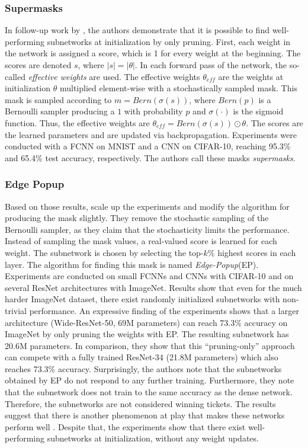 \subsubsection{Supermasks}
In follow-up work by \textcite{DBLP:conf/nips/ZhouLLY19}, the authors demonstrate that it is possible to find well-performing subnetworks at initialization by only pruning.
First, each weight in the network is assigned a score, which is 1 for every weight at the beginning. 
The scores are denoted $s$, where $|s| = |\theta|$.
In each forward pass of the network, the so-called \textit{effective weights} are used.
The effective weights $\theta_{eff}$ are the weights at initialization $\theta$ multiplied element-wise with a stochastically sampled mask.
This mask is sampled according to $m = \textit{Bern}(\sigma(s))$, where $\textit{Bern}(p)$ is a Bernoulli sampler producing a $1$ with probability $p$ and $\sigma(\cdot)$ is the sigmoid function. 
Thus, the effective weights are $\theta_{eff} = \textit{Bern}(\sigma(s)) \odot \theta$.
The scores are the learned parameters and are updated via backpropagation.
Experiments were conducted with a FCNN on MNIST and a CNN on CIFAR-10, reaching 95.3\% and 65.4\% test accuracy, respectively.
The authors call these masks \textit{supermasks}.

\subsubsection{Edge Popup}
Based on those results, \textcite{DBLP:conf/cvpr/RamanujanWKFR20} scale up the experiments and modify the algorithm for producing the mask slightly.
They remove the stochastic sampling of the Bernoulli sampler, as they claim that the stochasticity limits the performance. 
Instead of sampling the mask values, a real-valued score is learned for each weight. 
The subnetwork is chosen by selecting the top-$k$\% highest scores in each layer.
The algorithm for finding this mask is named \textit{Edge-Popup}(EP).
Experiments are conducted on small FCNNs and CNNs with CIFAR-10 and on several ResNet architectures with ImageNet.
Results show that even for the much harder ImageNet dataset, there exist randomly initialized subnetworks with non-trivial performance. 
An expressive finding of the experiments shows that a larger architecture (Wide-ResNet-50, 69M parameters) can reach 73.3\% accuracy on ImageNet by only pruning the weights with EP.
The resulting subnetwork has 20.6M parameters. In comparison, they show that this “pruning-only” approach can compete with a fully trained ResNet-34 (21.8M parameters) which also reaches 73.3\% accuracy. 
Surprisingly, the authors note that the subnetworks obtained by EP do not respond to any further training.
Furthermore, they note that the subnetwork does not train to the same accuracy as the dense network.
Therefore, the subnetworks are not considered winning tickets.
The results suggest that there is another phenomenon at play that makes these networks perform well \autocite{DBLP:conf/cvpr/RamanujanWKFR20}.
Despite that, the experiments show that there exist well-performing subnetworks at initialization, without any weight updates.

